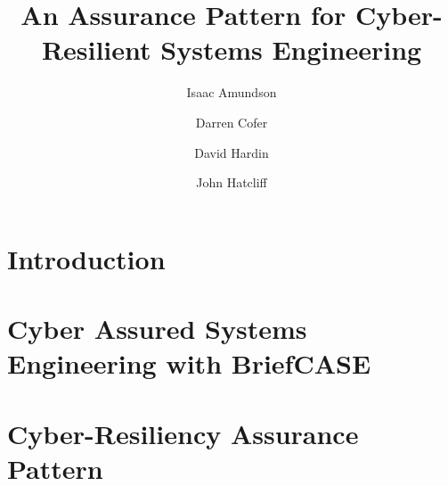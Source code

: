 \documentclass[runningheads]{llncs}
\begin{document}
\title{An Assurance Pattern for Cyber-Resilient Systems Engineering}

\author{
	Isaac Amundson 
	\and Darren Cofer 
	\and David Hardin 
	\and John Hatcliff}



\maketitle

\begin{abstract}

\end{abstract}


\section{Introduction}
\label{sec:introduction}





%

\section{Cyber Assured Systems Engineering with BriefCASE}
\label{sec:case}


\section{Cyber-Resiliency Assurance Pattern}
\label{sec:assurance-pattern}

\end{document}
